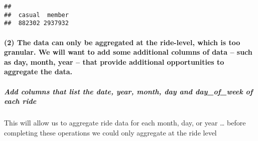 \documentclass[
]{article}
\newenvironment{Shaded}{\begin{snugshade}}{\end{snugshade}}
\newcommand{\FunctionTok}[1]{\textcolor[rgb]{0.00,0.00,0.00}{#1}}
\newcommand{\NormalTok}[1]{#1}
\newcommand{\OtherTok}[1]{\textcolor[rgb]{0.56,0.35,0.01}{#1}}
\newcommand{\SpecialCharTok}[1]{\textcolor[rgb]{0.00,0.00,0.00}{#1}}
\newcommand{\StringTok}[1]{\textcolor[rgb]{0.31,0.60,0.02}{#1}}
\begin{document}
\begin{Shaded}
\end{Shaded}

\begin{verbatim}
## 
##  casual  member 
##  882302 2937932
\end{verbatim}

\hypertarget{the-data-can-only-be-aggregated-at-the-ride-level-which-is-too-granular.-we-will-want-to-add-some-additional-columns-of-data-such-as-day-month-year-that-provide-additional-opportunities-to-aggregate-the-data.}{%
\paragraph{(2) The data can only be aggregated at the ride-level, which
is too granular. We will want to add some additional columns of data --
such as day, month, year -- that provide additional opportunities to
aggregate the
data.}\label{the-data-can-only-be-aggregated-at-the-ride-level-which-is-too-granular.-we-will-want-to-add-some-additional-columns-of-data-such-as-day-month-year-that-provide-additional-opportunities-to-aggregate-the-data.}}

\hypertarget{add-columns-that-list-the-date-year-month-day-and-day_of_week-of-each-ride}{%
\subparagraph{Add columns that list the date, year, month, day and
day\_of\_week of each
ride}\label{add-columns-that-list-the-date-year-month-day-and-day_of_week-of-each-ride}}

This will allow us to aggregate ride data for each month, day, or year
\ldots{} before completing these operations we could only aggregate at
the ride level

\begin{Shaded}
\end{Shaded}
\end{document}
